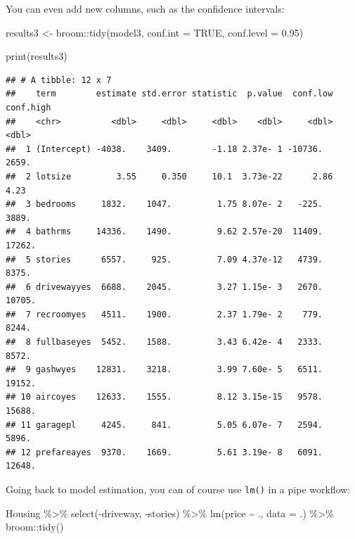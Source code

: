 \documentclass[
]{article}
\newenvironment{Shaded}{\begin{snugshade}}{\end{snugshade}}
\newcommand{\AttributeTok}[1]{\textcolor[rgb]{0.77,0.63,0.00}{#1}}
\newcommand{\ConstantTok}[1]{\textcolor[rgb]{0.00,0.00,0.00}{#1}}
\newcommand{\FloatTok}[1]{\textcolor[rgb]{0.00,0.00,0.81}{#1}}
\newcommand{\FunctionTok}[1]{\textcolor[rgb]{0.00,0.00,0.00}{#1}}
\newcommand{\NormalTok}[1]{#1}
\newcommand{\OtherTok}[1]{\textcolor[rgb]{0.56,0.35,0.01}{#1}}
\newcommand{\SpecialCharTok}[1]{\textcolor[rgb]{0.00,0.00,0.00}{#1}}
\begin{document}
You can even add new columns, such as the confidence intervals:

\begin{Shaded}
\begin{Highlighting}[]
\NormalTok{results3 }\OtherTok{\textless{}{-}}\NormalTok{ broom}\SpecialCharTok{::}\FunctionTok{tidy}\NormalTok{(model3, }\AttributeTok{conf.int =} \ConstantTok{TRUE}\NormalTok{, }\AttributeTok{conf.level =} \FloatTok{0.95}\NormalTok{)}

\FunctionTok{print}\NormalTok{(results3)}
\end{Highlighting}
\end{Shaded}

\begin{verbatim}
## # A tibble: 12 x 7
##    term        estimate std.error statistic  p.value  conf.low conf.high
##    <chr>          <dbl>     <dbl>     <dbl>    <dbl>     <dbl>     <dbl>
##  1 (Intercept) -4038.    3409.        -1.18 2.37e- 1 -10736.     2659.  
##  2 lotsize         3.55     0.350     10.1  3.73e-22      2.86      4.23
##  3 bedrooms     1832.    1047.         1.75 8.07e- 2   -225.     3889.  
##  4 bathrms     14336.    1490.         9.62 2.57e-20  11409.    17262.  
##  5 stories      6557.     925.         7.09 4.37e-12   4739.     8375.  
##  6 drivewayyes  6688.    2045.         3.27 1.15e- 3   2670.    10705.  
##  7 recroomyes   4511.    1900.         2.37 1.79e- 2    779.     8244.  
##  8 fullbaseyes  5452.    1588.         3.43 6.42e- 4   2333.     8572.  
##  9 gashwyes    12831.    3218.         3.99 7.60e- 5   6511.    19152.  
## 10 aircoyes    12633.    1555.         8.12 3.15e-15   9578.    15688.  
## 11 garagepl     4245.     841.         5.05 6.07e- 7   2594.     5896.  
## 12 prefareayes  9370.    1669.         5.61 3.19e- 8   6091.    12648.
\end{verbatim}

Going back to model estimation, you can of course use \texttt{lm()} in a pipe workflow:

\begin{Shaded}
\begin{Highlighting}[]
\NormalTok{Housing }\SpecialCharTok{\%\textgreater{}\%}
  \FunctionTok{select}\NormalTok{(}\SpecialCharTok{{-}}\NormalTok{driveway, }\SpecialCharTok{{-}}\NormalTok{stories) }\SpecialCharTok{\%\textgreater{}\%}
  \FunctionTok{lm}\NormalTok{(price }\SpecialCharTok{\textasciitilde{}}\NormalTok{ ., }\AttributeTok{data =}\NormalTok{ .) }\SpecialCharTok{\%\textgreater{}\%}
\NormalTok{  broom}\SpecialCharTok{::}\FunctionTok{tidy}\NormalTok{()}
\end{Highlighting}
\end{Shaded}
\end{document}
